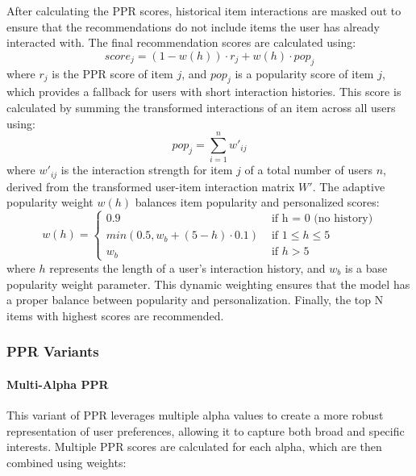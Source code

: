 \documentclass[conference,compsoc]{IEEEtran}
\begin{document}
After calculating the PPR scores, historical item interactions are masked out to ensure that the recommendations do not include items the user has already interacted with. The final recommendation scores are calculated using:
    \begin{equation}
        score_j = (1 - w(h)) \cdot r_j + w(h) \cdot pop_j
    \end{equation}
where \(r_j\) is the PPR score of item \(j\), and \(pop_j\) is a popularity score of item \(j\), which provides a fallback for users with short interaction histories. This score is calculated by summing the transformed interactions of an item across all users using:
    \begin{equation}
        pop_j = \sum_{i=1}^{n}w'_{ij}
    \end{equation}
where \(w'_{ij}\) is the interaction strength for item \(j\) of a total number of users \(n\), derived from the transformed user-item interaction matrix \(W'\). The adaptive popularity weight \(w(h)\) balances item popularity and personalized scores:
    \begin{equation}
        w(h) = \begin{cases}
        0.9 & \text{ if h = 0 (no history)} \\
        min(0.5,w_b + (5-h) \cdot 0.1) &  \text{ if } 1 \leq h \leq 5 \\
       w_b & \text{ if } h > 5
        \end{cases}
    \end{equation}
where \(h\) represents the length of a user’s interaction history, and \(w_b\)  is a base popularity weight parameter. This dynamic weighting ensures that the model has a proper balance between popularity and personalization. Finally, the top N items with highest scores are recommended.

\subsubsection{PPR Variants}

\paragraph{\textbf{Multi-Alpha PPR}}
This variant of PPR leverages multiple alpha values to create a more robust representation of user preferences, allowing it to capture both broad and specific interests. Multiple PPR scores are calculated for each alpha, which are then combined using weights:
\end{document}

